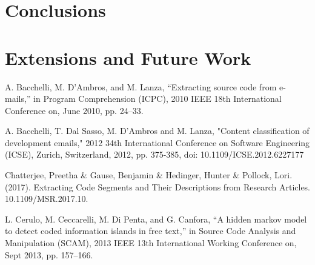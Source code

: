 \documentclass[12pt]{scrreprt}
\begin{document}






\chapter{Conclusions}



\chapter{Extensions and Future Work}



\begin{thebibliography}{9}

    A. Bacchelli, M. D’Ambros, and M. Lanza, “Extracting source code from e-mails,” in Program Comprehension (ICPC), 2010 IEEE 18th International Conference on, June 2010, pp. 24–33.

    A. Bacchelli, T. Dal Sasso, M. D'Ambros and M. Lanza, "Content classification of development emails," 2012 34th International Conference on Software Engineering (ICSE), Zurich, Switzerland, 2012, pp. 375-385, doi: 10.1109/ICSE.2012.6227177

    Chatterjee, Preetha \& Gause, Benjamin \& Hedinger, Hunter \& Pollock, Lori. (2017). Extracting Code Segments and Their Descriptions from Research Articles. 10.1109/MSR.2017.10. 

    L. Cerulo, M. Ceccarelli, M. Di Penta, and G. Canfora, “A hidden markov model to detect coded information islands in free text,” in Source Code Analysis and Manipulation (SCAM), 2013 IEEE 13th International Working Conference on, Sept 2013, pp. 157–166.

\end{thebibliography}
\end{document}
